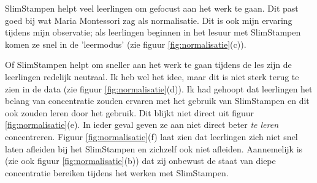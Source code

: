 \documentclass[12pt, a4paper]{article}
\begin{document}
SlimStampen helpt veel leerlingen om gefocust aan het werk te gaan. Dit past goed bij wat Maria Montessori zag als normalisatie. Dit is ook mijn ervaring tijdens mijn observatie; als leerlingen beginnen in het lesuur met SlimStampen komen ze snel in de 'leermodus' (zie figuur \ref*{fig:normalisatie}(c)).

Of SlimStampen helpt om sneller aan het werk te gaan tijdens de les zijn de leerlingen redelijk neutraal. Ik heb wel het idee, maar dit is niet sterk terug te zien in de data (zie figuur \ref*{fig:normalisatie}(d)).
Ik had gehoopt dat leerlingen het belang van concentratie zouden ervaren met het gebruik van SlimStampen en dit ook zouden leren door het gebruik. Dit blijkt niet direct uit figuur \ref*{fig:normalisatie}(e). In ieder geval geven ze aan niet direct beter \emph{te leren} concentreren. 
Figuur \ref*{fig:normalisatie}(f) laat zien dat leerlingen zich niet snel laten afleiden bij het SlimStampen en zichzelf ook niet afleiden. Aannemelijk is (zie ook figuur \ref*{fig:normalisatie}(b)) dat zij onbewust de staat van diepe concentratie bereiken tijdens het werken met SlimStampen.
\end{document}
